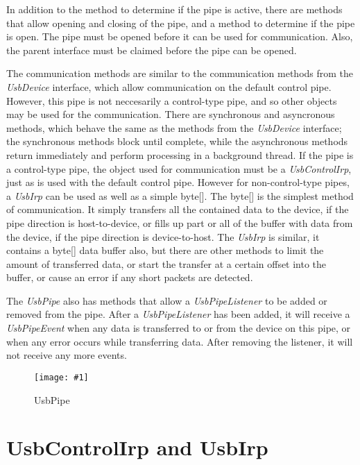 \documentclass{article}
\newcommand{\myclass}[1]{\emph{#1}}
\newcommand{\myinterface}[1]{\emph{#1}}
\newcommand{\mysectionend}[0]{\vfill\pagebreak[1]}
\newcommand{\myfigure}[3]{\begin{figure}[htbp]\centering\texttt{[image: \#1]}\caption{#2}\label{#3}\end{figure}}
\begin{document}
In addition to the method to determine if the pipe is active, there
are methods that allow opening and closing of the pipe, and a method
to determine if the pipe is open.  The pipe must be opened before
it can be used for communication.  Also, the parent interface must
be claimed before the pipe can be opened.

The communication methods are similar to the communication methods
from the \myinterface{UsbDevice} interface, which allow communication on the default
control pipe.  However, this pipe is not neccesarily a control-type pipe,
and so other objects may be used for the communication.  There are
synchronous and asyncronous methods, which behave the same as the
methods from the \myinterface{UsbDevice} interface; the synchronous methods block
until complete, while the asynchronous methods return immediately
and perform processing in a background thread.  If the pipe is a
control-type pipe, the object used for communication must be
a \myinterface{UsbControlIrp}, just as is used with the default control pipe.
However for non-control-type pipes, a \myinterface{UsbIrp} can be used as
well as a simple byte[].  The byte[] is the simplest method
of communication.  It simply transfers all the contained data
to the device, if the pipe direction is host-to-device, or fills up
part or all of the buffer with data from the device, if the pipe
direction is device-to-host.  The \myinterface{UsbIrp} is similar, it contains
a byte[] data buffer also, but there are other methods to limit
the amount of transferred data, or start the transfer at a certain offset
into the buffer, or cause an error if any short packets are detected.

The \myinterface{UsbPipe} also has methods that allow a \myinterface{UsbPipeListener} to be added or removed
from the pipe.  After a \myinterface{UsbPipeListener} has been added, it will receive a
\myclass{UsbPipeEvent} when any data is transferred to or from the device on this pipe,
or when any error occurs while transferring data.  After removing the listener,
it will not receive any more events.

\myfigure{figs/UsbPipe}{UsbPipe}{UsbPipe}

\mysectionend

%

\section{UsbControlIrp and UsbIrp}
\end{document}
